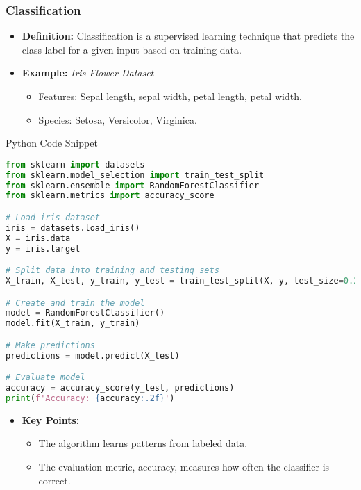 \documentclass[aspectratio=169]{beamer}
\begin{document}
\begin{frame}[fragile]
    \frametitle{Classification}
    \begin{itemize}
        \item \textbf{Definition:} Classification is a supervised learning technique that predicts the class label for a given input based on training data.
        \item \textbf{Example:} \textit{Iris Flower Dataset}
        \begin{itemize}
            \item Features: Sepal length, sepal width, petal length, petal width.
            \item Species: Setosa, Versicolor, Virginica.
        \end{itemize}
    \end{itemize}
    
    \begin{block}{Python Code Snippet}
    \begin{lstlisting}[language=Python]
from sklearn import datasets
from sklearn.model_selection import train_test_split
from sklearn.ensemble import RandomForestClassifier
from sklearn.metrics import accuracy_score

# Load iris dataset
iris = datasets.load_iris()
X = iris.data
y = iris.target

# Split data into training and testing sets
X_train, X_test, y_train, y_test = train_test_split(X, y, test_size=0.2, random_state=42)

# Create and train the model
model = RandomForestClassifier()
model.fit(X_train, y_train)

# Make predictions
predictions = model.predict(X_test)

# Evaluate model
accuracy = accuracy_score(y_test, predictions)
print(f'Accuracy: {accuracy:.2f}')
    \end{lstlisting}
    \end{block}
    
    \begin{itemize}
        \item \textbf{Key Points:}
        \begin{itemize}
            \item The algorithm learns patterns from labeled data.
            \item The evaluation metric, accuracy, measures how often the classifier is correct.
        \end{itemize}
    \end{itemize}
\end{frame}
\end{document}
